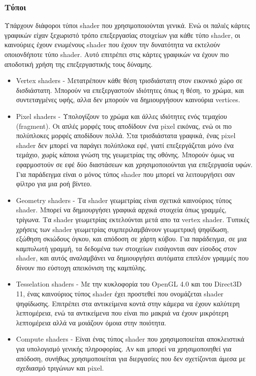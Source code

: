 \subsubsection{Τύποι}
Υπάρχουν διάφοροι τύποι shader που χρησιμοποιούνται γενικά. Ενώ οι παλιές κάρτες γραφικών είχαν ξεχωριστό τρόπο επεξεργασίας στοιχείων για κάθε τύπο shader, οι καινούριες έχουν ενωμένους shader που έχουν την δυνατότητα να εκτελούν οποιονδήποτε τύπο shader. Αυτό επιτρέπει στις κάρτες γραφικών να έχουν πιο αποδοτική χρήση της επεξεργαστικής τους δύναμης.\cite{computeshaders-2}
\begin{itemize}
\item Vertex shaders - Μετατρέπουν κάθε θέση τρισδιάστατη στον εικονικό χώρο σε δισδιάστατη. Μπορούν να επεξεργαστούν ιδιότητες όπως η θέση, το χρώμα, και συντεταγμένες υφής, αλλα δεν μπορούν να δημιουργήσουν καινούρια vertices.
\item Pixel shaders - Υπολογίζουν το χρώμα και άλλες ιδιότητες ενός τεμαχίου (fragment). Οι απλές μορφές τους αποδίδουν ένα pixel εικόνας, ενώ οι πιο πολύπλοκες μορφές αποδίδουν πολλά. Στα τρισδιάστατα γραφικά, ένας pixel shader δεν μπορεί να παράγει πολύπλοκα εφέ, γιατί επεξεργάζεται μόνο ένα τεμάχιο, χωρίς κάποια γνώση της γεωμετρίας της οθόνης. Μπορούν όμως να εφαρμοστούν σε εφέ δύο διαστάσεων και χρησιμοποιούνται για επεξεργασία υφών. Για παράδειγμα είναι ο μόνος τύπος shader που μπορεί να λειτουργήσει σαν φίλτρο για μια ροή βίντεο.
\item Geometry shaders - Τα shader γεωμετρίας είναι σχετικά καινούριος τύπος shader. Μπορεί να δημιουργήσει γραφικά αρχικά στοιχεία όπως γραμμές, τρίγωνα. Τα shader γεωμετρίας εκτελούνται μετά απο τα vertex shader. Τυπικές χρήσεις των shader γεωμετρίας συμπεριλαμβάνουν γεωμετρική ψηφίδωση, εξώθηση σκιώδους όγκου, και απόδοση σε χάρτη κύβου. Για παράδειγμα, σε μια καμπυλωτή γραμμή, τα δεδομένα των στοιχείων εισάγονται σαν είσοδος στον shader, και αυτός αναλαμβάνει να δημιουργήσει αυτόματα επιπλέον γραμμές που δίνουν πιο εύστοχη απεικόνιση της καμπύλης.
\item Tesselation shaders - Με την κυκλοφορία του OpenGL 4.0 και του Direct3D 11, ένας καινούριος τύπος shader έχει προστεθεί που ονομάζεται shader ψηφίδωσης. Επιτρέπει στα αντικείμενα κοντά στην κάμερα να έχουν καλύτερη λεπτομέρεια, ενώ τα αντικείμενα που είναι πιο μακριά να έχουν μικρότερη λεπτομέρεια αλλά να μοιάζουν όμοια στην ποιότητα.
\item Compute shaders - Είναι ένας τύπος shader που χρησιμοποιείται αποκλειστικά για υπολογισμό γενικής πληροφορίας. Αν και μπορεί να χρησιμοποιηθεί για απόδοση, συνήθως χρησιμοποιείται για διεργασίες που δεν σχετίζονται άμεσα με σχεδιασμό τριγώνων και pixel.
\end{itemize}
